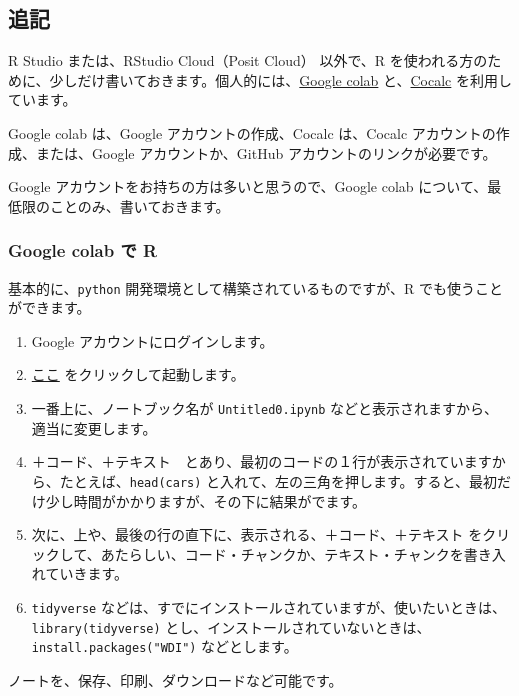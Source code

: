 \documentclass[
]{bxjsbook}
\providecommand{\tightlist}{%
  \setlength{\itemsep}{0pt}\setlength{\parskip}{0pt}}
\theoremstyle{definition}
\theoremstyle{definition}
\theoremstyle{definition}
\theoremstyle{definition}
\theoremstyle{remark}
\begin{document}
\hypertarget{ux8ffdux8a18}{%
\subsection{追記}\label{ux8ffdux8a18}}

R Studio または、RStudio Cloud（Posit Cloud） 以外で、R を使われる方のために、少しだけ書いておきます。個人的には、\href{https://colab.research.google.com}{Google colab} と、\href{https://cocalc.com}{Cocalc} を利用しています。

Google colab は、Google アカウントの作成、Cocalc は、Cocalc アカウントの作成、または、Google アカウントか、GitHub アカウントのリンクが必要です。

Google アカウントをお持ちの方は多いと思うので、Google colab について、最低限のことのみ、書いておきます。

\hypertarget{google-colab-ux3067-r}{%
\subsubsection{Google colab で R}\label{google-colab-ux3067-r}}

基本的に、\texttt{python} 開発環境として構築されているものですが、R でも使うことができます。

\begin{enumerate}
\def\labelenumi{\arabic{enumi}.}
\tightlist
\item
  Google アカウントにログインします。
\item
  \href{https://colab.research.google.com/\#create=true\&language=r}{ここ} をクリックして起動します。
\item
  一番上に、ノートブック名が \texttt{Untitled0.ipynb} などと表示されますから、適当に変更します。
\item
  ＋コード、＋テキスト　とあり、最初のコードの１行が表示されていますから、たとえば、\texttt{head(cars)} と入れて、左の三角を押します。すると、最初だけ少し時間がかかりますが、その下に結果がでます。
\item
  次に、上や、最後の行の直下に、表示される、＋コード、＋テキスト をクリックして、あたらしい、コード・チャンクか、テキスト・チャンクを書き入れていきます。
\item
  \texttt{tidyverse} などは、すでにインストールされていますが、使いたいときは、\texttt{library(tidyverse)} とし、インストールされていないときは、\texttt{install.packages("WDI")} などとします。
\end{enumerate}

ノートを、保存、印刷、ダウンロードなど可能です。
\end{document}
